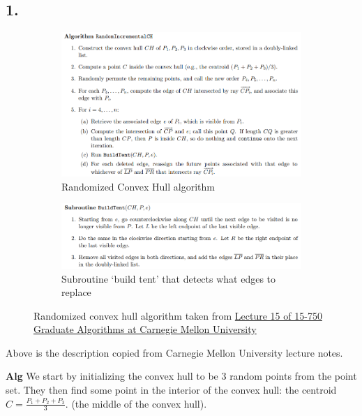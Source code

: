 \documentclass[11pt]{article}
\begin{document}
\subsection*{1. }

\begin{figure}[h]
    \centering
    \begin{subfigure}{0.7 \textwidth}
        \includegraphics[width = \textwidth]{randomized_CH.png}
        \caption{Randomized Convex Hull algorithm}
    \end{subfigure}
    \begin{subfigure}{0.7 \textwidth}
        \includegraphics[width = \textwidth]{buildTent.png}
        \caption{Subroutine `build tent' that detects what edges to replace}
    \end{subfigure}
    \caption{Randomized convex hull algorithm taken from 
    \href{http://www.cs.cmu.edu/afs/cs/academic/class/15750-s17/ScribeNotes/Lecture15/lecture15.pdf}{Lecture 15 of 15-750 Graduate Algorithms at Carnegie Mellon University}}
\end{figure}

Above is the description copied from Carnegie Mellon University lecture notes.

\textbf{Alg}
We start by initializing the convex hull to be 3 random points from the point set.
They then find some point in the interior of the convex hull: the centroid $C = \frac{P_1 + P_2 + P_3}{3}$.
(the middle of the convex hull).
\end{document}

